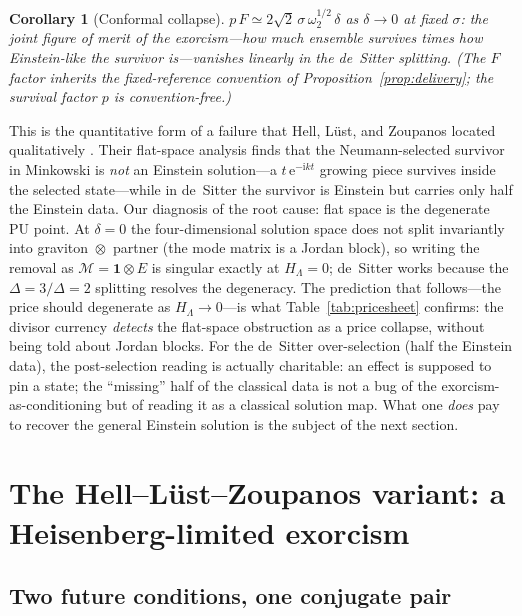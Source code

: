 \documentclass[11pt]{article}
\newtheorem{corollary}[theorem]{Corollary}
\theoremstyle{definition}
\theoremstyle{remark}
\newcommand{\ii}{\mathrm{i}}
\newcommand{\ee}{\mathrm{e}}
\begin{document}
\begin{corollary}[Conformal collapse]
\label{cor:collapse}
$p\,F\simeq2\sqrt{2}\,\sigma\,\omega_{2}^{1/2}\,\delta$ as
$\delta\to0$ at fixed $\sigma$: the joint figure of merit of the
exorcism---how much ensemble survives times how Einstein-like the
survivor is---vanishes \emph{linearly} in the de~Sitter splitting. (The
$F$ factor inherits the fixed-reference convention of
Proposition~\ref{prop:delivery}; the survival factor $p$ is
convention-free.)
\end{corollary}

This is the quantitative form of a failure that Hell, L\"ust, and
Zoupanos located qualitatively \cite{HLZ}. Their flat-space analysis
finds that the Neumann-selected survivor in Minkowski is \emph{not}
an Einstein solution---a $t\,\ee^{-\ii kt}$ growing piece survives
inside the selected state---while in de~Sitter the survivor is
Einstein but carries only half the Einstein data. Our diagnosis of
the root cause: flat space is the degenerate PU point. At
$\delta=0$ the four-dimensional solution space does not split
invariantly into graviton~$\otimes$~partner (the mode matrix is a
Jordan block), so writing the removal as
$\mathcal{M}=\mathbf{1}\otimes E$ is singular exactly at $H_{\Lambda}=0$;
de~Sitter works because the $\Delta=3/\Delta=2$ splitting resolves
the degeneracy. The prediction that follows---the price should
degenerate as $H_{\Lambda}\to0$---is what
Table~\ref{tab:pricesheet} confirms: the divisor currency
\emph{detects} the flat-space obstruction as a price collapse, without
being told about Jordan blocks. For the de~Sitter over-selection
(half the Einstein data), the post-selection reading is actually
charitable: an effect is supposed to pin a state; the ``missing''
half of the classical data is not a bug of the exorcism-as-conditioning
but of reading it as a classical solution map. What one \emph{does}
pay to recover the general Einstein solution is the subject of the
next section.

\section{The Hell--L\"ust--Zoupanos variant: a Heisenberg-limited
exorcism}
\label{sec:hlz}

\subsection{Two future conditions, one conjugate pair}
\end{document}
